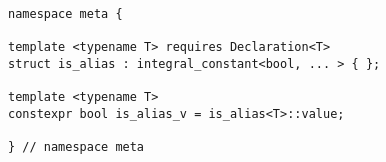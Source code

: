 
\begin{verbatim}
namespace meta {

template <typename T> requires Declaration<T>
struct is_alias : integral_constant<bool, ... > { };

template <typename T>
constexpr bool is_alias_v = is_alias<T>::value;

} // namespace meta
\end{verbatim}
